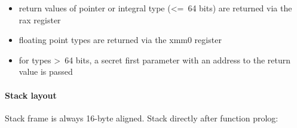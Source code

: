 \begin{itemize}
\item return values of pointer or integral type (\textless=\ 64 bits) are returned via the rax register
\item floating point types are returned via the xmm0 register
\item for types \textgreater\ 64 bits, a secret first parameter with an address to the return value is passed
\end{itemize}


\paragraph{Stack layout}

Stack frame is always 16-byte aligned. Stack directly after function prolog:\\

